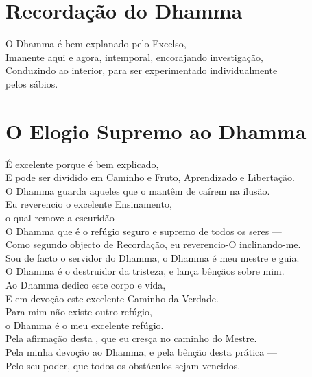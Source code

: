 \clearpage

\chapter{Recordação do Dhamma}

\begin{leader}
\end{leader}

O Dhamma é bem explanado pelo Excelso,\\
Imanente aqui e agora, intemporal, encorajando investigação,\\
Conduzindo ao interior, para ser experimentado individualmente\\
\vin pelos sábios.

\nextChapterUseDelegatedPageNumber

\chapter{O Elogio Supremo ao Dhamma}

\begin{leader}
\end{leader}

É excelente porque é bem explicado,\\
E pode ser dividido em Caminho e Fruto, Aprendizado e Libertação.\\
O Dhamma guarda aqueles que o mantêm de caírem na ilusão.\\
Eu reverencio o excelente Ensinamento,\\
\vin o qual remove a escuridão ---\\
O Dhamma que é o refúgio seguro e supremo de todos os seres ---\\
Como segundo objecto de Recordação, eu reverencio-O inclinando-me.\\
Sou de facto o servidor do Dhamma, o Dhamma é meu mestre e guia.\\
O Dhamma é o destruidor da tristeza, e lança bênçãos sobre mim.\\
Ao Dhamma dedico este corpo e vida,\\
E em devoção  este excelente Caminho da Verdade.\\
Para mim não existe outro refúgio,\\
\vin o Dhamma é o meu excelente refúgio.\\
Pela afirmação desta , que eu cresça no caminho do Mestre.\\
Pela minha devoção ao Dhamma, e pela bênção desta prática ---\\
Pelo seu poder, que todos os obstáculos sejam vencidos.

